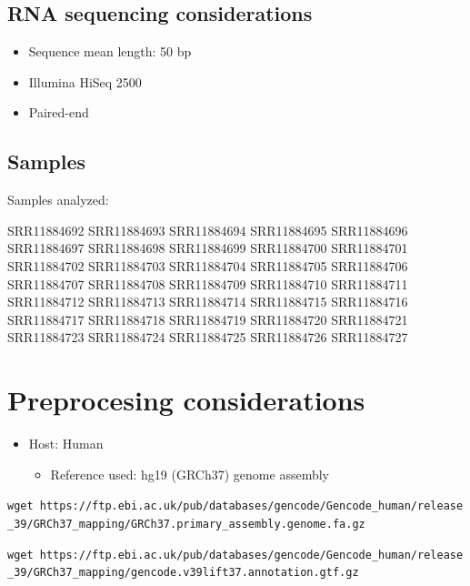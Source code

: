 \documentclass[
]{book}
\providecommand{\tightlist}{%
  \setlength{\itemsep}{0pt}\setlength{\parskip}{0pt}}
\begin{document}
\hypertarget{rna-sequencing-considerations}{%
\subsection{RNA sequencing considerations}\label{rna-sequencing-considerations}}

\begin{itemize}
\tightlist
\item
  Sequence mean length: 50 bp\\
\item
  Illumina HiSeq 2500\\
\item
  Paired-end
\end{itemize}

\hypertarget{samples}{%
\subsection{Samples}\label{samples}}

Samples analyzed:

SRR11884692
SRR11884693
SRR11884694
SRR11884695
SRR11884696
SRR11884697
SRR11884698
SRR11884699
SRR11884700
SRR11884701
SRR11884702
SRR11884703
SRR11884704
SRR11884705
SRR11884706
SRR11884707
SRR11884708
SRR11884709
SRR11884710
SRR11884711
SRR11884712
SRR11884713
SRR11884714
SRR11884715
SRR11884716
SRR11884717
SRR11884718
SRR11884719
SRR11884720
SRR11884721
SRR11884723
SRR11884724
SRR11884725
SRR11884726
SRR11884727

\hypertarget{preprocesing-considerations}{%
\section{Preprocesing considerations}\label{preprocesing-considerations}}

\begin{itemize}
\item
  Host: Human

  \begin{itemize}
  \tightlist
  \item
    Reference used: hg19 (GRCh37) genome assembly
  \end{itemize}
\end{itemize}

\texttt{wget\ https://ftp.ebi.ac.uk/pub/databases/gencode/Gencode\_human/release\_39/GRCh37\_mapping/GRCh37.primary\_assembly.genome.fa.gz}

\texttt{wget\ https://ftp.ebi.ac.uk/pub/databases/gencode/Gencode\_human/release\_39/GRCh37\_mapping/gencode.v39lift37.annotation.gtf.gz}
\end{document}
